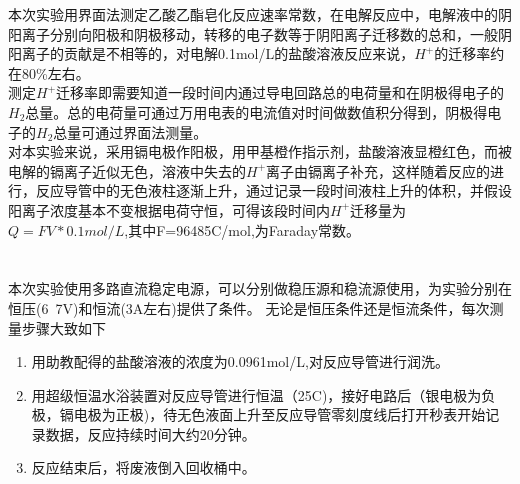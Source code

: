 ﻿\documentclass[10.5pt]{article}
\begin{document}
\title{\textbf{}} %
\author{}
\maketitle
\section{\textbf{}}
本次实验用界面法测定乙酸乙酯皂化反应速率常数，在电解反应中，电解液中的阴阳离子分别向阳极和阴极移动，转移的电子数等于阴阳离子迁移数的总和，一般阴阳离子的贡献是不相等的，对电解0.1mol/L的盐酸溶液反应来说，$H^+$的迁移率约在80\%左右。\\
测定$H^+$迁移率即需要知道一段时间内通过导电回路总的电荷量和在阴极得电子的$H_2$总量。总的电荷量可通过万用电表的电流值对时间做数值积分得到，阴极得电子的$H_2$总量可通过界面法测量。\\
对本实验来说，采用镉电极作阳极，用甲基橙作指示剂，盐酸溶液显橙红色，而被电解的镉离子近似无色，溶液中失去的$H^+$离子由镉离子补充，这样随着反应的进行，反应导管中的无色液柱逐渐上升，通过记录一段时间液柱上升的体积，并假设阳离子浓度基本不变根据电荷守恒，可得该段时间内$H^+$迁移量为$Q=FV*0.1mol/L$,其中F=96485C/mol,为Faraday常数。
\section{\textbf{}}

\subsection{\textbf{}}
本次实验使用多路直流稳定电源，可以分别做稳压源和稳流源使用，为实验分别在恒压(6~7V)和恒流(3A左右)提供了条件。
无论是恒压条件还是恒流条件，每次测量步骤大致如下
\begin{enumerate}
\item 用助教配得的盐酸溶液的浓度为0.0961mol/L,对反应导管进行润洗。
\item 用超级恒温水浴装置对反应导管进行恒温（25\degree C)，接好电路后（银电极为负极，镉电极为正极)，待无色液面上升至反应导管零刻度线后打开秒表开始记录数据，反应持续时间大约20分钟。
\item 反应结束后，将废液倒入回收桶中。
\end{enumerate}
\section{\textbf{}}
\end{document}
